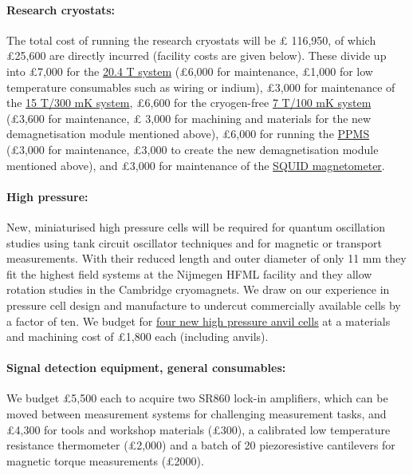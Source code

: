 \documentclass[prl,a4paper,11pt]{revtex4-2}
\begin{document}
\begin{singlespace}
\paragraph{Research cryostats:} 
The total cost of running the research cryostats will be \pounds
116,950, of which \pounds 25,600 are directly incurred (facility costs are given below). 
These divide up into \pounds 7,000 for 
the \ul{20.4 T system} (\pounds 6,000 for
maintenance, \pounds 1,000 for low temperature consumables such as
wiring or indium),
\pounds 3,000 for maintenance of the \ul{15 T/300 mK system}, \pounds 6,600 for the
cryogen-free \ul{7 T/100 mK system} (\pounds 3,600 for maintenance, \pounds
3,000 for machining and materials for the new demagnetisation module mentioned above), \pounds 6,000
for running the \ul{PPMS} (\pounds 3,000 for maintenance, \pounds 3,000 to create the new demagnetisation module mentioned above), and \pounds 3,000 for maintenance of the  \ul{SQUID magnetometer}. 

\paragraph{High pressure:}
New, miniaturised high pressure cells will be required for quantum oscillation studies using tank circuit oscillator techniques and for magnetic or transport measurements. With their  reduced length and outer diameter of only 11 mm they fit the highest field systems at the Nijmegen HFML facility and they allow rotation studies in the Cambridge cryomagnets. We draw on our experience in pressure cell design and
manufacture to undercut commercially available cells by a factor of ten.
We budget for \ul{four new high pressure anvil cells} at a
materials and machining cost of \pounds 1,800 each (including anvils). 

\paragraph{Signal detection equipment, general consumables:}
We budget \pounds 5,500 each to acquire two SR860 lock-in amplifiers, which can be moved between measurement systems for challenging measurement tasks, and \pounds 4,300 for tools and workshop materials (\pounds 300),
a calibrated low temperature resistance thermometer (\pounds 2,000) and a batch of 20 piezoresistive cantilevers for magnetic torque measurements (\pounds 2000). 



\end{singlespace}
\end{document}
